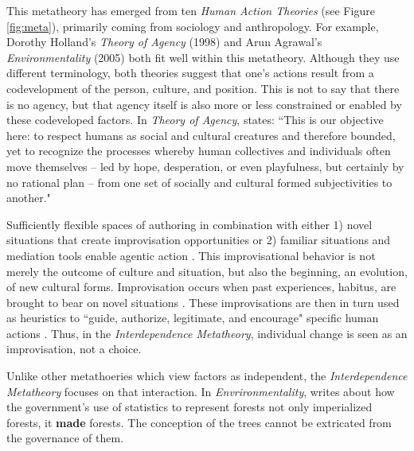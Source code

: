 \documentclass[12 pt]{article}
\begin{document}
		This metatheory has emerged from ten \textit{Human Action Theories} (see Figure \ref{fig:meta}), primarily coming from sociology and anthropology. For example, Dorothy Holland's \textit{Theory of Agency} (1998) and Arun Agrawal's \textit{Environmentality} (2005) both fit well within this metatheory. Although they use different terminology, both theories suggest that one's actions result from a codevelopment of the person, culture, and position. This is not to say that there is no agency, but that agency itself is also more or less constrained or enabled by these codeveloped factors. In \textit{Theory of Agency}, \textcite{Holland1998} states: ``This is our objective here: to respect humans as social and cultural creatures and therefore bounded, yet to recognize the processes whereby human collectives and individuals often move themselves  -- led by hope, desperation, or even playfulness, but certainly by no rational plan -- from one set of socially and cultural formed subjectivities to another."
		
		Sufficiently flexible spaces of authoring \parencite{Bakhtin1981} in combination with either 1) novel situations that create improvisation opportunities or 2) familiar situations and mediation tools \parencite{Vigotsky1978} enable agentic action \parencite{Holland1998}. This improvisational behavior is not merely the outcome of culture and situation, but also the beginning, an evolution, of new cultural forms. Improvisation occurs when past experiences, habitus, are brought to bear on novel situations \parencite{Bourdieu1977}. These improvisations are then in turn used as heuristics to ``guide, authorize, legitimate, and encourage" specific human actions \parencite[][p. 18]{Holland1998}. Thus, in the \textit{Interdependence Metatheory}, individual change is seen as an improvisation, not a choice. 
		
		Unlike other metathoeries which view factors as independent, the \textit{Interdependence Metatheory} focuses on that interaction. In \textit{Envrironmentality}, \textcite{Agrawal2005} writes about how the government's use of statistics to represent forests not only imperialized forests, it \textbf{made} forests. The conception of the trees cannot be extricated from the governance of them. 	
		
\end{document}

